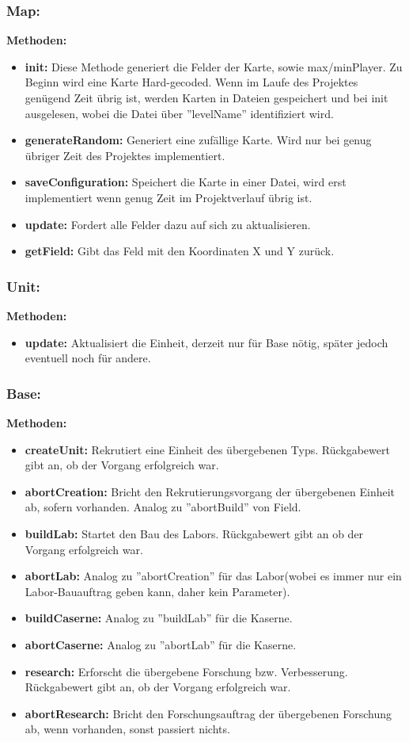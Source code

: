 \documentclass[fontsize=12pt,paper=a4,twoside]{scrartcl}
\begin{document}
\subsubsection{Map:}
\textbf{Methoden:}
\begin{itemize}
	\item \textbf{init:} Diese Methode generiert die Felder der Karte, sowie max/minPlayer. Zu Beginn wird eine Karte Hard-gecoded. Wenn im Laufe des Projektes genügend Zeit übrig ist, werden Karten in Dateien gespeichert und bei init ausgelesen, wobei die Datei über ''levelName'' identifiziert wird.
	\item \textbf{generateRandom:} Generiert eine zufällige Karte. Wird nur bei genug übriger Zeit des Projektes implementiert.
	\item \textbf{saveConfiguration:} Speichert die Karte in einer Datei, wird erst implementiert wenn genug Zeit im Projektverlauf übrig ist.
	\item \textbf{update:} Fordert alle Felder dazu auf sich zu aktualisieren.
	\item \textbf{getField:} Gibt das Feld mit den Koordinaten X und Y zurück.
\end{itemize}

\subsubsection{Unit:}
\textbf{Methoden:}
\begin{itemize}
	\item \textbf{update:} Aktualisiert die Einheit, derzeit nur für Base nötig, später jedoch eventuell noch für andere.
\end{itemize}


\subsubsection{Base:}
\textbf{Methoden:}
\begin{itemize}
	\item \textbf{createUnit:} Rekrutiert eine Einheit des übergebenen Typs. Rückgabewert gibt an, ob der Vorgang erfolgreich war.
	\item \textbf{abortCreation:} Bricht den Rekrutierungsvorgang der übergebenen Einheit ab, sofern vorhanden. Analog zu ''abortBuild'' von Field.
	\item \textbf{buildLab:} Startet den Bau des Labors. Rückgabewert gibt an ob der Vorgang erfolgreich war.
	\item \textbf{abortLab:} Analog zu ''abortCreation'' für das Labor(wobei es immer nur ein Labor-Bauauftrag geben kann, daher kein Parameter).
	\item \textbf{buildCaserne:} Analog zu ''buildLab'' für die Kaserne.
	\item \textbf{abortCaserne:} Analog zu ''abortLab'' für die Kaserne.
	\item \textbf{research:} Erforscht die übergebene Forschung bzw. Verbesserung. Rückgabewert gibt an, ob der Vorgang erfolgreich war.
	\item \textbf{abortResearch:} Bricht den Forschungsauftrag der übergebenen Forschung ab, wenn vorhanden, sonst passiert nichts.
\end{itemize}
\end{document}
